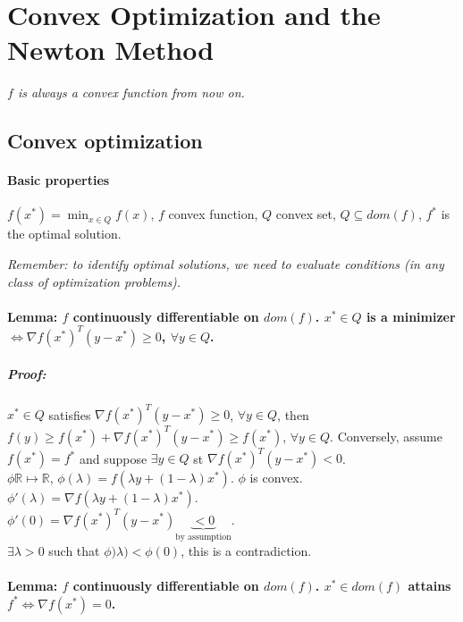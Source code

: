 \documentclass[main]{subfiles}
\begin{document}

\section{Convex Optimization and the Newton Method}

\emph{$f$ is always a convex function from now on.}

\subsection{Convex optimization}
\paragraph{Basic properties}
$f(x^*) = \displaystyle \min_{x \in Q} f(x)$, $f$ convex function, $Q$ convex
set, $Q \subseteq dom(f)$, $f^*$ is the optimal solution.

\emph{Remember: to identify optimal solutions, we need to evaluate conditions
(in any class of optimization problems).}

\paragraph{Lemma: $f$ continuously differentiable on $dom(f)$. $x^* \in Q$ is a
minimizer $\iff \nabla f(x^*)^T (y-x^*) \geq 0$, $\forall y \in Q$.}

\subparagraph{Proof:}
$x^* \in Q$ satisfies $\nabla f(x^*)^T (y-x^*) \geq 0$, $\forall y \in Q$, then
$f(y) \geq f(x^*) + \nabla f(x^*)^T (y-x^*) \geq f(x^*)$, $\forall y \in Q$.
Conversely, assume $f(x^*) = f^*$ and suppose $\exists y \in Q$ st $\nabla
f(x^*)^T (y-x^*) < 0$.\\
$\phi \mathbb{R} \mapsto \mathbb{R}$, $\phi(\lambda) = f(\lambda y +
(1-\lambda)x^*)$. $\phi$ is convex.\\
$\phi'(\lambda) = \nabla f(\lambda y + (1-\lambda)x^*)$.\\
$\phi'(0) = \nabla f(x^*)^T(y-x^*) \underbrace{< 0}_{\text{by assumption}}$.\\
$\exists \lambda > 0$ such that $\phi)\lambda) < \phi(0)$, this is a
contradiction.

\paragraph{Lemma: $f$ continuously differentiable on $dom(f)$. $x^* \in dom(f)$
attains $f^* \iff \nabla f(x^*) = 0$.}
\end{document}
